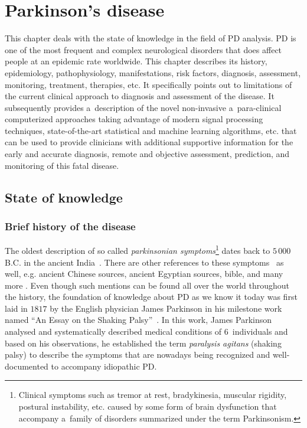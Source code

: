 \chapter[Parkinson's disease]{Parkinson's disease}
\label{ch1}

This chapter deals with the state of knowledge in the field of PD analysis. PD is one of the most frequent and complex neurological disorders that does affect people at an epidemic rate worldwide. This chapter describes its history, epidemiology, pathophysiology, manifestations, risk factors, diagnosis, assessment, monitoring, treatment, therapies, etc. It specifically points out to limitations of the current clinical approach to diagnosis and assessment of the disease. It subsequently provides a~description of the novel non-invasive a~para-clinical computerized approaches taking advantage of modern signal processing techniques, state-of-the-art statistical and machine learning algorithms, etc. that can be used to provide clinicians with additional supportive information for the early and accurate diagnosis, remote and objective assessment, prediction, and monitoring of this fatal disease.

\section{State of knowledge}
\label{ch1_1}

\subsection{Brief history of the disease}
\label{ch1_1.1}

The oldest description of so called \textit{parkinsonian symptoms}\footnote{Clinical symptoms such as tremor at rest, bradykinesia, muscular rigidity, postural instability, etc. caused by some form of brain dysfunction that accompany a~family of disorders summarized under the term Parkinsonism.} dates back to $5\,000$ B.C. in the ancient India~\cite{Manyam1990}. There are other references to these symptoms~\cite{Diaz2004} as well, e.g. ancient Chinese sources, ancient Egyptian sources, bible, and many more \cite{Zhang2006, Lees2007, Goetz2011}. Even though such mentions can be found all over the world throughout the history, the foundation of knowledge about PD as we know it today was first laid in $1817$ by the English physician James Parkinson in his milestone work named ``An Essay on the Shaking Palsy''~\cite{Parkinson2002}. In this work, James Parkinson analysed and systematically described medical conditions of $6$~individuals and based on his observations, he established the term \textit{paralysis agitans} (shaking palsy) to describe the symptoms that are nowadays being recognized and well-documented to accompany idiopathic PD.

